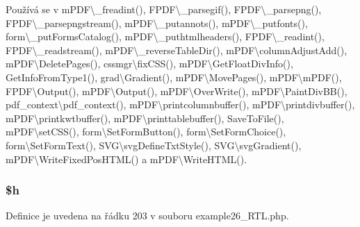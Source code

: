 Používá se v m\-P\-D\-F\textbackslash{}\-\_\-freadint(), F\-P\-D\-F\textbackslash{}\-\_\-parsegif(), F\-P\-D\-F\textbackslash{}\-\_\-parsepng(), F\-P\-D\-F\textbackslash{}\-\_\-parsepngstream(), m\-P\-D\-F\textbackslash{}\-\_\-putannots(), m\-P\-D\-F\textbackslash{}\-\_\-putfonts(), form\textbackslash{}\-\_\-put\-Forms\-Catalog(), m\-P\-D\-F\textbackslash{}\-\_\-puthtmlheaders(), F\-P\-D\-F\textbackslash{}\-\_\-readint(), F\-P\-D\-F\textbackslash{}\-\_\-readstream(), m\-P\-D\-F\textbackslash{}\-\_\-reverse\-Table\-Dir(), m\-P\-D\-F\textbackslash{}column\-Adjust\-Add(), m\-P\-D\-F\textbackslash{}\-Delete\-Pages(), cssmgr\textbackslash{}fix\-C\-S\-S(), m\-P\-D\-F\textbackslash{}\-Get\-Float\-Div\-Info(), Get\-Info\-From\-Type1(), grad\textbackslash{}\-Gradient(), m\-P\-D\-F\textbackslash{}\-Move\-Pages(), m\-P\-D\-F\textbackslash{}m\-P\-D\-F(), F\-P\-D\-F\textbackslash{}\-Output(), m\-P\-D\-F\textbackslash{}\-Output(), m\-P\-D\-F\textbackslash{}\-Over\-Write(), m\-P\-D\-F\textbackslash{}\-Paint\-Div\-B\-B(), pdf\-\_\-context\textbackslash{}pdf\-\_\-context(), m\-P\-D\-F\textbackslash{}printcolumnbuffer(), m\-P\-D\-F\textbackslash{}printdivbuffer(), m\-P\-D\-F\textbackslash{}printkwtbuffer(), m\-P\-D\-F\textbackslash{}printtablebuffer(), Save\-To\-File(), m\-P\-D\-F\textbackslash{}set\-C\-S\-S(), form\textbackslash{}\-Set\-Form\-Button(), form\textbackslash{}\-Set\-Form\-Choice(), form\textbackslash{}\-Set\-Form\-Text(), S\-V\-G\textbackslash{}svg\-Define\-Txt\-Style(), S\-V\-G\textbackslash{}svg\-Gradient(), m\-P\-D\-F\textbackslash{}\-Write\-Fixed\-Pos\-H\-T\-M\-L() a m\-P\-D\-F\textbackslash{}\-Write\-H\-T\-M\-L().

\hypertarget{example26___r_t_l_8php_ab00da9d5d8bd5b6b944793e093860aff}{
\subsubsection[{\$h}]{\setlength{\rightskip}{0pt plus 5cm}\$h}}\label{example26___r_t_l_8php_ab00da9d5d8bd5b6b944793e093860aff}


Definice je uvedena na řádku 203 v souboru example26\-\_\-\-R\-T\-L.\-php.




